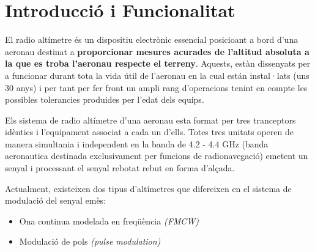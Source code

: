 \section{Introducció i Funcionalitat}

El radio altímetre és un dispositiu electrònic essencial posicioant a bord d'una aeronau destinat a \textbf{proporcionar mesures acurades de l'altitud absoluta a la que es troba l'aeronau respecte el terreny}. 
Aquests, estàn dissenyats per a funcionar durant tota la vida útil de l'aeronau en la cual están instal·lats (uns 30 anys) i per tant per fer front un ampli rang d'operacions tenint en compte les possibles tolerancies produides per l'edat dels equips.

Els sistema de radio altímetre d'una aeronau esta format per tres tranceptors idèntics i l'equipament associat a cada un d'ells. Totes tres unitats operen de manera simultania i independent en la banda de 4.2 - 4.4 GHz (banda aeronautica destinada exclusivament per funcions de radionavegació) emetent un senyal i processant el senyal rebotat rebut en forma d'alçada.

Actualment, existeixen dos tipus d'altímetres que difereixen en el sistema de modulació del senyal emès: 
\begin{itemize}
\item Ona continua modelada en freqüència \textit{(FMCW)}
\item Modulació de pols \textit{(pulse modulation)}
\end{itemize}







